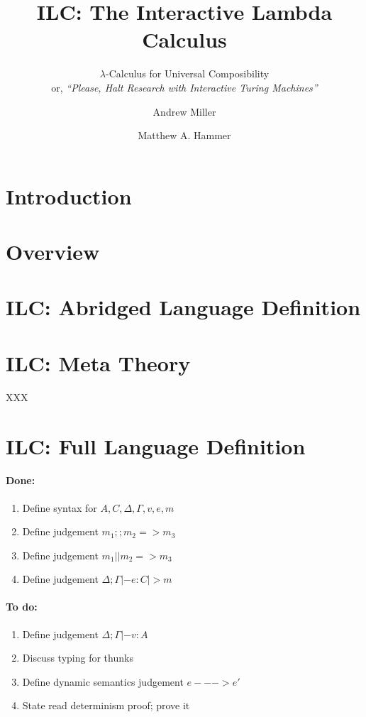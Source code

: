 \documentclass{llncs}
\title{ILC: The Interactive Lambda Calculus}
\subtitle{$\lambda$-Calculus for Universal Composibility
  \\
  or, \emph{``Please, Halt Research with Interactive Turing Machines''}
}
\author{Andrew Miller\inst{1} \and Matthew A. Hammer\inst{2}}
\institute{University of Illinois \and University of Colorado Boulder}
\begin{document}
\maketitle

\begin{abstract}

\end{abstract}

\section{Introduction}

\section{Overview}

\section{ILC: Abridged Language Definition}

\section{ILC: Meta Theory}

\begin{theorem}
\label{thm:read-det}
XXX
\end{theorem}


\appendix
\section{ILC: Full Language Definition}


\paragraph{Done:}
\begin{enumerate}
\item Define syntax for $A, C, \Delta, \Gamma, v, e, m$
\item Define judgement $m_1 ;; m_2 => m_3$
\item Define judgement $m_1 || m_2 => m_3$
\item Define judgement $\Delta; \Gamma |- e : C |> m$
\end{enumerate}

\paragraph{To do:}
\begin{enumerate}
\item Define judgement $\Delta; \Gamma |- v : A$
\item Discuss typing for thunks
\item Define dynamic semantics judgement $e ---> e'$
\item State read determinism proof; prove it
\end{enumerate}
\end{document}
